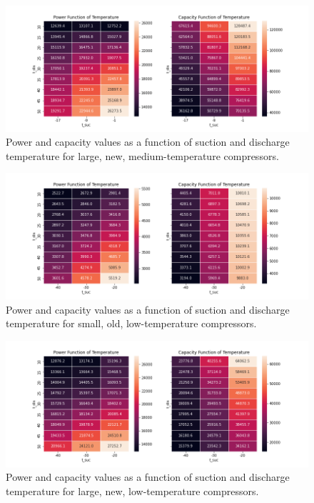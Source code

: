 \begin{figure}
    \centering \includegraphics[width=1.0\textwidth]{figures/refrigeration_MTnew.png}
    \caption[Compressor performance for large, new, medium temperature compressors]{Power and capacity values as a function of suction and discharge temperature for large, new, medium-temperature compressors.}
    \label{fig:refrig_mt_new}
\end{figure}

\begin{figure}
    \centering \includegraphics[width=1.0\textwidth]{figures/refrigeration_LTold.png}
    \caption[Compressor performance for small, old, low temperature compressors]{Power and capacity values as a function of suction and discharge temperature for small, old, low-temperature compressors.}
    \label{fig:refrig_lt_old}
\end{figure}

\begin{figure}
    \centering \includegraphics[width=1.0\textwidth]{figures/refrigeration_LTnew.png}
    \caption[Compressor performance for large, new, low temperature compressors]{Power and capacity values as a function of suction and discharge temperature for large, new, low-temperature compressors.}
    \label{fig:refrig_lt_new}
\end{figure}